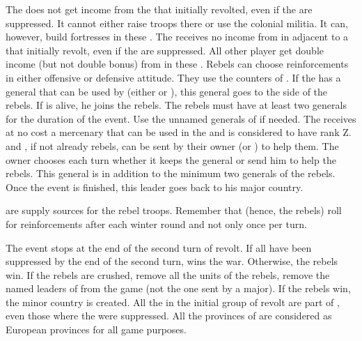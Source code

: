 \phadm
\aparag The \MAJ does not get income from the \COL that initially revolted,
even if the \REVOLT are suppressed.
\bparag It cannot either raise troops there or use the colonial militia.
\bparag It can, however, build fortresses in these \COL.
\aparag The \MAJ receives no income from \TradeFLEET in \STZ adjacent to a
\COL that initially revolt, even if the \REVOLT are suppressed.
\bparag All other player get double income (but not double bonus) from
\TradeFLEET in these \STZ.
\aparag Rebels can choose reinforcements in either offensive or defensive
attitude. They use the counters of \paysusa.
\aparag If the \MAJ has a general that can be used by \paysusa (either
\leaderWashington or ), this general goes to the side of
the rebels.
\bparag If \leaderArnold is alive, he joins the rebels.
\bparag The rebels must have at least two generals for the duration of the
event. Use the unnamed generals of \paysusa if needed.
\aparag The \MAJ receives at no cost a mercenary that can be used in the \ROTW
and is considered to have rank Z.
\aparag \leaderWashington and , if not already rebels, can
be sent by their owner (\ENG or \FRA) to help them.
\bparag The owner chooses each turn whether it keeps the general or send him
to help the rebels.
\bparag This general is in addition to the minimum two generals of the rebels.
\bparag Once the event is finished, this leader goes back to his major
country.

\phmil
\aparag \REVOLT are supply sources for the rebel troops.
\aparag Remember that \paysusa (hence, the rebels) roll for reinforcements
after each winter round and not only once per turn.

\phpaix
\aparag The event stops at the end of the second turn of revolt.
\bparag If all \REVOLT have been suppressed by the end of the second turn,
\MAJ wins the war.
\bparag Otherwise, the rebels win.
\aparag If the rebels are crushed, remove all the units of the rebels, remove
the named leaders of \paysusa from the game (not the one sent by a major).
\aparag If the rebels win, the minor country \paysusa is created.
\bparag All the \COL in the initial group of revolt are part of \paysusa, even
those where the \REVOLT were suppressed.
\bparag All the provinces of \paysusa are considered as European provinces for
all game purposes.



